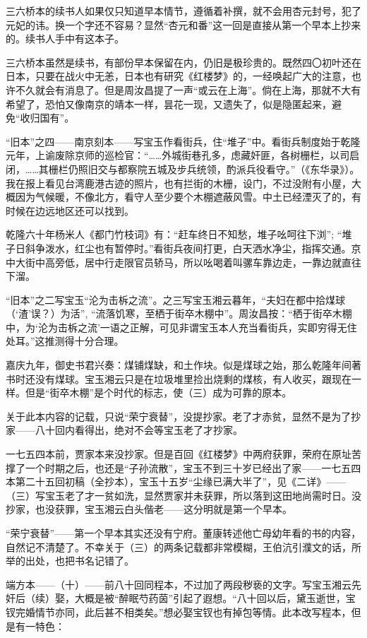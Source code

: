 \par 三六桥本的续书人如果仅只知道早本情节，遵循着补撰，就不会用杏元封号，犯了元妃的讳。换一个字还不容易？显然“杏元和番”这一回是直接从第一个早本上抄来的。续书人手中有这本子。
\par 三六桥本虽然是续书，有部份早本保留在内，仍旧是极珍贵的。既然四〇初叶还在日本，只要在战火中无恙，日本也有研究《红楼梦》的，一经唤起广大的注意，也许不久就会有消息了。但是周汝昌提了一声“或云在上海”。倘在上海，那就不大有希望了，恐怕又像南京的靖本一样，昙花一现，又遗失了，似是隐匿起来，避免“收归国有”。
\par “旧本”之四——南京刻本——写宝玉作看街兵，住“堆子”中。看街兵制度始于乾隆元年，上谕废除京师的巡检官：“……外城街巷孔多，虑藏奸匪，各树栅栏，以司启闭，……其栅栏仍照旧交与都察院五城及步兵统领，酌派兵役看守。”（《东华录》）。我在报上看见台湾鹿港古迹的照片，也有拦街的木栅，设门，不过没附有小屋，大概因为气候暖，不像北方，看守人至少要个木棚遮蔽风雪。中土已经湮灭了的，有时候在边远地区还可以找到。
\par 乾隆六十年杨米人《都门竹枝词》有：“赶车终日不知愁，堆子吆呵往下浏”; “堆子日斜争泼水，红尘也有暂停时。”看街兵夜间打更，白天洒水净尘，指挥交通。京中大街中高旁低，居中行走限官员轿马，所以吆喝着叫骡车靠边走，一靠边就直往下溜。
\par “旧本”之二写宝玉“沦为击柝之流”。之三写宝玉湘云暮年，“夫妇在都中拾煤球（‘渣’误？）为活”, “流落饥寒，至栖于街卒木棚中”。周汝昌按：“栖于街卒木棚中，为‘沦为击柝之流’一语之正解，可见非谓宝玉本人充当看街兵，实即穷得无住处耳。”这推测得十分合理。
\par 嘉庆九年，御史书君兴奏：煤铺煤缺，和土作块。似是煤球之始，那么乾隆年间著书时还没有煤球。宝玉湘云只是在垃圾堆里捡出烧剩的煤核，有人收买，跟现在一样。但是“街卒木棚”是个时代的标志，使（三）成为可靠的原本。
\par 关于此本内容的记载，只说“荣宁衰替”，没提抄家。老了才赤贫，显然不是为了抄家——八十回内看得出，绝对不会等宝玉老了才抄家。
\par 一七五四本前，贾家本来没抄家。但是百回《红楼梦》中两府获罪，荣府在原址苦撑了一个时期之后，也还是“子孙流散”，宝玉不到三十岁已经出了家——一七五四本第二十五回初稿（全抄本），宝玉十五岁“尘缘已满大半了”，见《二详》——（三）写宝玉老了才一贫如洗，显然贾家并未获罪，所以落到这田地尚需时日。没抄家，也没获罪，宝玉湘云白头偕老——这分明就是第一个早本。
\par “荣宁衰替”——第一个早本其实还没有宁府。董康转述他亡母幼年看的书的内容，自然记不清楚了。不幸关于（三）的两条记载都非常模糊，王伯沆引濮文\ZhiXian 的话，所举的出处，也把书名记错了。
\par 端方本——（十）——前八十回同程本，不过加了两段秽亵的文字。写宝玉湘云先奸后（续）娶，大概是被“醉眠芍药茵”引起了遐想。“八十回以后，黛玉逝世，宝钗完婚情节亦同，此后甚不相类矣。”想必娶宝钗也有掉包等情。此本改写程本，但是有一特色：
